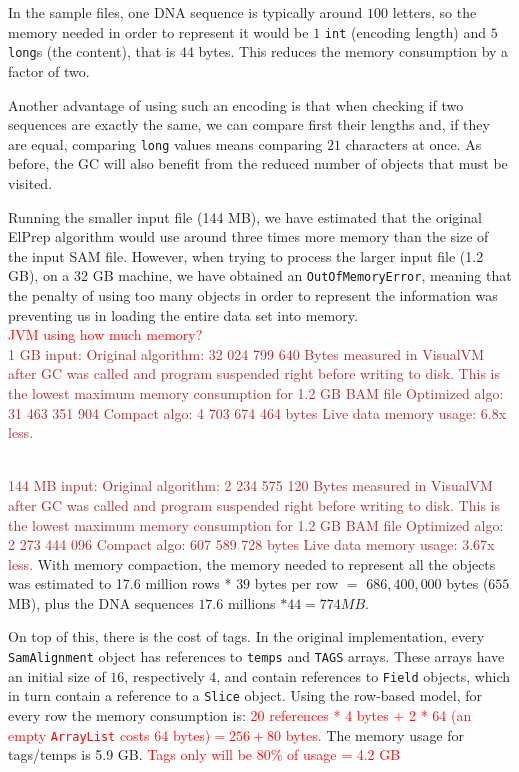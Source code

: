 \documentclass[a4paper,twoside]{article}
\begin{document}
In the sample files, one DNA sequence is typically around $100$ letters, so the memory needed in order to represent it would be $1$ {\tt int} (encoding length) and $5$ {\tt long}s (the content), that is $44$ bytes. This reduces the memory consumption by a factor of two.

Another advantage of using such an encoding is that when checking if two sequences are exactly the same, we can compare first their lengths and, if they are equal, comparing {\tt long} values means comparing $21$ characters at once.
As before, the GC will also benefit from the reduced number of objects that must be visited.




Running the smaller input file (144 MB), we have estimated that the original ElPrep algorithm would use around three times more memory than the size of the input SAM file.
However, when trying to process the larger input file (1.2 GB), on a 32 GB machine, we have obtained an {\tt OutOfMemoryError}, meaning that the penalty of using too many objects in order to represent the information was preventing us in loading the entire data set into memory.
\\ \textcolor{red}{JVM using how much memory?}
\\ \textcolor{brown}{
	1 GB input:
	Original algorithm: 32 024 799 640 Bytes measured in VisualVM after GC was called and program suspended right before writing to disk. This is the lowest maximum memory consumption for 1.2 GB BAM file
	Optimized algo: 31 463 351 904
	Compact algo: 4 703 674 464 bytes	
	Live data memory usage: 6.8x less.
}

\\ \textcolor{brown}{
	144 MB input:
	Original algorithm: 2 234 575 120 Bytes measured in VisualVM after GC was called and program suspended right before writing to disk. This is the lowest maximum memory consumption for 1.2 GB BAM file
	Optimized algo: 2 273 444 096
	Compact algo: 607 589 728 bytes	
	Live data memory usage: 3.67x less.
}
With memory compaction, the memory needed to represent all the objects was estimated to 17.6 million rows * $39$ bytes per row $=$ $686,400,000$ bytes ($655$ MB), plus the DNA sequences  $17.6$ millions $* 44 = 774 MB$.


On top of this, there is the cost of tags.
In the original implementation, every {\tt SamAlignment} object has references to {\tt temps} and {\tt TAGS} arrays. These arrays have an initial size of $16$, respectively $4$, and contain references to {\tt Field} objects, which in turn contain a reference to a {\tt Slice} object.
Using the row-based model, for every row the memory consumption is:
\textcolor{red}{20 references * 4 bytes + 2 * 64 (an empty {\tt ArrayList} costs 64 bytes)$= 256 + 80$ bytes.}
The memory usage for tags/temps is 5.9 GB. 
\textcolor{red}{Tags only will be 80\% of usage = 4.2 GB}
\end{document}
